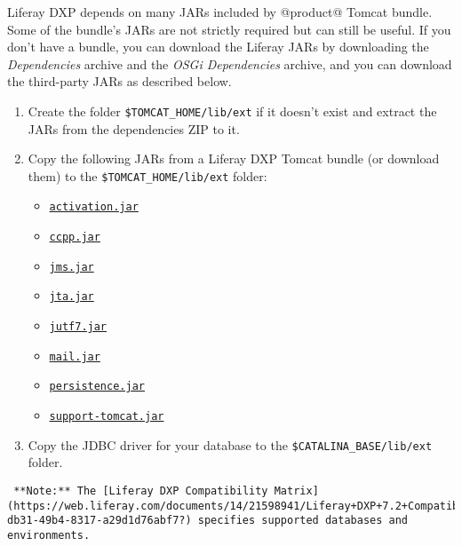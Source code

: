 Liferay DXP depends on many JARs included by @product@ Tomcat bundle.
Some of the bundle's JARs are not strictly required but can still be
useful. If you don't have a bundle, you can download the Liferay JARs by
downloading the \emph{Dependencies} archive and the \emph{OSGi
Dependencies} archive, and you can download the third-party JARs as
described below.

\begin{enumerate}
\def\labelenumi{\arabic{enumi}.}
\item
  Create the folder \texttt{\$TOMCAT\_HOME/lib/ext} if it doesn't exist
  and extract the JARs from the dependencies ZIP to it.
\item
  Copy the following JARs from a Liferay DXP Tomcat bundle (or download
  them) to the \texttt{\$TOMCAT\_HOME/lib/ext} folder:

  \begin{itemize}
  \tightlist
  \item
    \href{http://www.oracle.com/technetwork/java/javase/jaf-136260.html}{\texttt{activation.jar}}
  \item
    \href{http://mvnrepository.com/artifact/javax.ccpp/ccpp/1.0}{\texttt{ccpp.jar}}
  \item
    \href{http://www.oracle.com/technetwork/java/docs-136352.html}{\texttt{jms.jar}}
  \item
    \href{http://www.oracle.com/technetwork/java/javaee/jta/index.html}{\texttt{jta.jar}}
  \item
    \href{http://mvnrepository.com/artifact/com.beetstra.jutf7/jutf7}{\texttt{jutf7.jar}}
  \item
    \href{http://www.oracle.com/technetwork/java/index-138643.html}{\texttt{mail.jar}}
  \item
    \href{http://mvnrepository.com/artifact/org.eclipse.persistence/javax.persistence/2.1.1}{\texttt{persistence.jar}}
  \item
    \href{http://mvnrepository.com/artifact/com.liferay.portal/com.liferay.support.tomcat}{\texttt{support-tomcat.jar}}
  \end{itemize}
\item
  Copy the JDBC driver for your database to the
  \texttt{\$CATALINA\_BASE/lib/ext} folder.
\end{enumerate}

\noindent\hrulefill

\begin{verbatim}
 **Note:** The [Liferay DXP Compatibility Matrix](https://web.liferay.com/documents/14/21598941/Liferay+DXP+7.2+Compatibility+Matrix/b6e0f064-db31-49b4-8317-a29d1d76abf7?) specifies supported databases and environments.
\end{verbatim}

